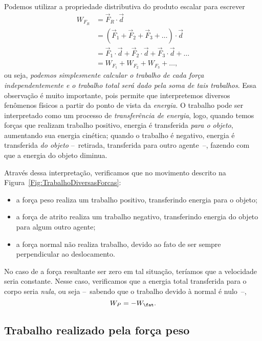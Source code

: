 Podemos utilizar a propriedade distributiva do produto escalar para escrever
\begin{align}
    W_{F_R} &= \vec{F}_R \cdot \vec{d} \\
    &= (\vec{F}_1 + \vec{F}_2 + \vec{F}_3 + \dots) \cdot \vec{d} \\
    &= \vec{F}_1 \cdot \vec{d} + \vec{F}_2 \cdot \vec{d} + \vec{F}_3 \cdot \vec{d} + \dots \\
    &= W_{F_1} + W_{F_2} +  W_{F_3} + \dots, 
\end{align}
%
ou seja, \emph{podemos simplesmente calcular o trabalho de cada força independentemente e o trabalho total será dado pela soma de tais trabalhos}. Essa observação é muito importante, pois permite que interpretemos diversos fenômenos físicos a partir do ponto de vista da \emph{energia}. O trabalho pode ser interpretado como um processo de \emph{transferência de energia}, logo, quando temos forças que realizam trabalho positivo, energia é transferida \emph{para o objeto}, aumentando sua energia cinética; quando o trabalho é negativo, energia é transferida \emph{do objeto} --~retirada, transferida para outro agente~--, fazendo com que a energia do objeto diminua.

Através dessa interpretação, verificamos que no movimento descrito na Figura~\ref{Fig:TrabalhoDiversasForcas}:
\begin{itemize}
    \item a força peso realiza um trabalho positivo, transferindo energia para o objeto;
    \item a força de atrito realiza um trabalho negativo, transferindo energia do objeto para algum outro agente;
    \item a força normal não realiza trabalho, devido ao fato de ser sempre perpendicular ao deslocamento.
\end{itemize}
%
No caso de a força resultante ser zero em tal situação, teríamos que a velocidade seria constante. Nesse caso, verificamos que a energia total transferida para o corpo seria \emph{nula}, ou seja --~sabendo que o trabalho devido à normal é nulo~--,
\begin{equation}
  W_P = - W_{\fat}.
\end{equation}

\subsection{Trabalho realizado pela força peso}

